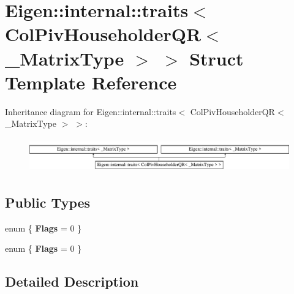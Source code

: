 \hypertarget{struct_eigen_1_1internal_1_1traits_3_01_col_piv_householder_q_r_3_01___matrix_type_01_4_01_4}{}\section{Eigen\+:\+:internal\+:\+:traits$<$ Col\+Piv\+Householder\+QR$<$ \+\_\+\+Matrix\+Type $>$ $>$ Struct Template Reference}
\label{struct_eigen_1_1internal_1_1traits_3_01_col_piv_householder_q_r_3_01___matrix_type_01_4_01_4}
Inheritance diagram for Eigen\+:\+:internal\+:\+:traits$<$ Col\+Piv\+Householder\+QR$<$ \+\_\+\+Matrix\+Type $>$ $>$\+:\begin{figure}[H]
\begin{center}
\leavevmode
\includegraphics[height=1.481482cm]{struct_eigen_1_1internal_1_1traits_3_01_col_piv_householder_q_r_3_01___matrix_type_01_4_01_4}
\end{center}
\end{figure}
\subsection*{Public Types}
\begin{DoxyCompactItemize}
\item 
\mbox{\label{struct_eigen_1_1internal_1_1traits_3_01_col_piv_householder_q_r_3_01___matrix_type_01_4_01_4_a00ed7fbdcc2aae314112d99d8d78b0d6}} 
enum \{ {\bfseries Flags} = 0
 \}
\item 
\mbox{\label{struct_eigen_1_1internal_1_1traits_3_01_col_piv_householder_q_r_3_01___matrix_type_01_4_01_4_afd9bcf4dd6cbf97f3d82d37eaacb1eda}} 
enum \{ {\bfseries Flags} = 0
 \}
\end{DoxyCompactItemize}


\subsection{Detailed Description}
